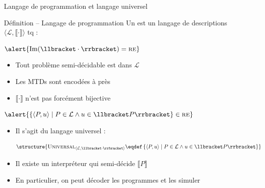 
\begingroup

\begin{frame}{Langage de programmation et langage universel}

  \vspace{-2mm}
  \begin{block}{Définition -- Langage de programmation}
    Un  est un langage de descriptions 
    \alert{$\langle \mathcal{L}, \llbracket \cdot \rrbracket \rangle$} tq :
    \begin{description}
    \item[Turing-complet :] $\alert{\operatorname{Im}(\llbracket \cdot \rrbracket) = \textsc{re}}$
      \begin{itemize}\small
      \item Tout problème semi-décidable est  dans $\mathcal{L}$
      \item Les MTDs sont encodées à  près
      \item $\llbracket \cdot \rrbracket$ n'est pas forcément bijective
      \end{itemize}
    \item[Effectif :] $\alert{\left\{ \langle P, u \rangle \mid P \in \mathcal{L} \land u \in \llbracket P \rrbracket \right\} \in \textsc{re}}$
      \begin{itemize}\small
      \item Il s'agit du langage universel :

        \vspace{-2mm}
        $$\structure{\textsc{Universal}_{\langle \mathcal{L}, \llbracket \cdot \rrbracket \rangle} \eqdef \left\{ \langle P, u \rangle \mid P \in \mathcal{L} \land u \in \llbracket P \rrbracket \right\}}$$
      \item\vspace{-1mm} Il existe un interpréteur qui semi-décide $\llbracket P \rrbracket$
      \item En particulier, on peut décoder les programmes et les simuler
      \end{itemize}
    \end{description}
  \end{block}


\end{frame}
